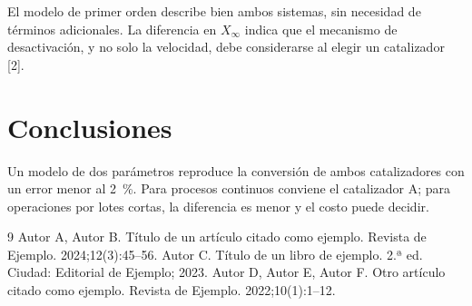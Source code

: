 \documentclass[10pt,letterpaper]{article}
\begin{document}
El modelo de primer orden describe bien ambos sistemas, sin necesidad de términos adicionales.
La diferencia en $X_\infty$ indica que el mecanismo de desactivación, y no solo la velocidad,
debe considerarse al elegir un catalizador [2].

\section{Conclusiones}

Un modelo de dos parámetros reproduce la conversión de ambos catalizadores con un error menor
al 2~\%. Para procesos continuos conviene el catalizador A; para operaciones por lotes cortas,
la diferencia es menor y el costo puede decidir.

\begin{thebibliography}{9}
 Autor A, Autor B. Título de un artículo citado como ejemplo. Revista de Ejemplo. 2024;12(3):45--56.
 Autor C. Título de un libro de ejemplo. 2.ª ed. Ciudad: Editorial de Ejemplo; 2023.
 Autor D, Autor E, Autor F. Otro artículo citado como ejemplo. Revista de Ejemplo. 2022;10(1):1--12.
\end{thebibliography}
\end{document}
